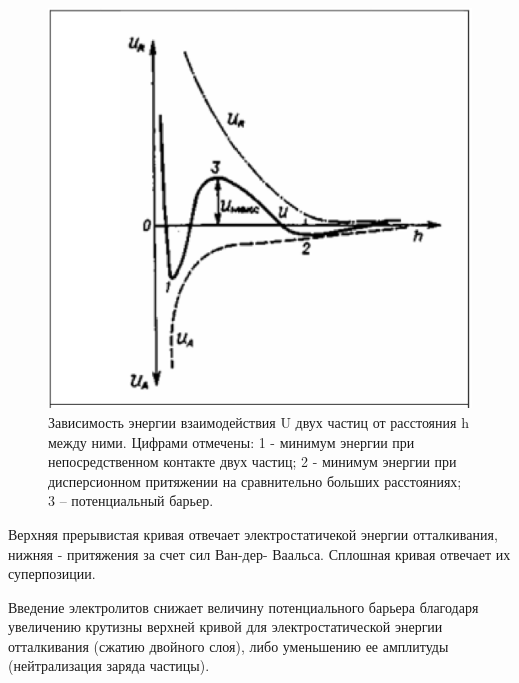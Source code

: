 \documentclass[a4paper,12pt]{article}
\begin{document}
\begin{figure}[h!]
    \centering
    \includegraphics[scale = 0.4]{Screenshot 2023-02-13 at 8.56.28 PM.png}
    \caption{Зависимость энергии взаимодействия U двух частиц от расстояния h между ними. Цифрами отмечены: 1 - минимум энергии при  непосредственном контакте двух частиц; 2 - минимум энергии при дисперсионном притяжении на сравнительно больших расстояниях; 3 – потенциальный барьер. }
    \label{fig : 1}
\end{figure}

Верхняя прерывистая кривая отвечает электростатичекой энергии отталкивания, 
нижняя - притяжения за счет сил Ван-дер- 
Ваальса. Сплошная кривая отвечает  их  суперпозиции.  

Введение электролитов снижает величину потенциального барьера благодаря увеличению крутизны верхней кривой для электростатической энергии отталкивания (сжатию двойного слоя), либо уменьшению ее амплитуды (нейтрализация заряда частицы).
\end{document}

